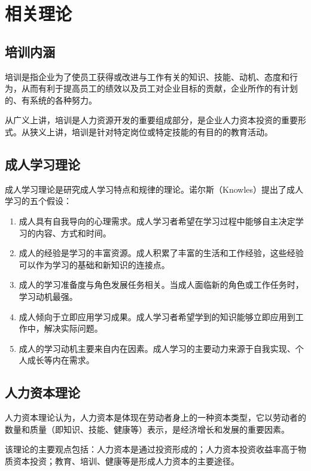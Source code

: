 \section{相关理论}

\subsection{培训内涵}

培训是指企业为了使员工获得或改进与工作有关的知识、技能、动机、态度和行为，从而有利于提高员工的绩效以及员工对企业目标的贡献，企业所作的有计划的、有系统的各种努力。

从广义上讲，培训是人力资源开发的重要组成部分，是企业人力资本投资的重要形式。从狭义上讲，培训是针对特定岗位或特定技能的有目的的教育活动。

\subsection{成人学习理论}

成人学习理论是研究成人学习特点和规律的理论。诺尔斯（Knowles）提出了成人学习的五个假设：

\begin{enumerate}
    \item 成人具有自我导向的心理需求。成人学习者希望在学习过程中能够自主决定学习的内容、方式和时间。
    \item 成人的经验是学习的丰富资源。成人积累了丰富的生活和工作经验，这些经验可以作为学习的基础和新知识的连接点。
    \item 成人的学习准备度与角色发展任务相关。当成人面临新的角色或工作任务时，学习动机最强。
    \item 成人倾向于立即应用学习成果。成人学习者希望学到的知识能够立即应用到工作中，解决实际问题。
    \item 成人的学习动机主要来自内在因素。成人学习的主要动力来源于自我实现、个人成长等内在需求。
\end{enumerate}

\subsection{人力资本理论}

人力资本理论认为，人力资本是体现在劳动者身上的一种资本类型，它以劳动者的数量和质量（即知识、技能、健康等）表示，是经济增长和发展的重要因素。

该理论的主要观点包括：人力资本是通过投资形成的；人力资本投资收益率高于物质资本投资；教育、培训、健康等是形成人力资本的主要途径。


